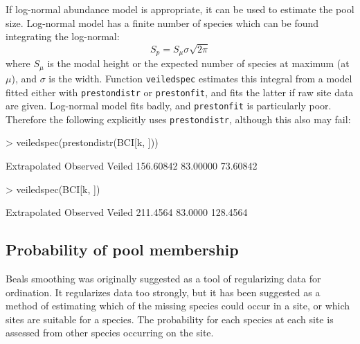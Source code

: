 \documentclass[a4paper,10pt]{amsart}
\begin{document}
If log-normal abundance model is appropriate, it can be used to
estimate the pool size.  Log-normal model has a finite number of
species which can be found integrating the log-normal:
\begin{equation}
S_p = S_\mu \sigma \sqrt{2 \pi}
\end{equation}
where $S_\mu$ is the modal height or the expected number of species at
maximum (at $\mu$), and $\sigma$ is the width.  Function
\texttt{veiledspec} estimates this integral from a model fitted either
with \texttt{prestondistr} or \texttt{prestonfit}, and fits the latter
if raw site data are given.  Log-normal model fits badly, and
\texttt{prestonfit} is particularly poor.  Therefore the following
explicitly uses \texttt{prestondistr}, although this also may fail:
\begin{Schunk}
\begin{Sinput}
> veiledspec(prestondistr(BCI[k, ]))
\end{Sinput}
\begin{Soutput}
Extrapolated     Observed       Veiled 
   156.60842     83.00000     73.60842 
\end{Soutput}
\begin{Sinput}
> veiledspec(BCI[k, ])
\end{Sinput}
\begin{Soutput}
Extrapolated     Observed       Veiled 
    211.4564      83.0000     128.4564 
\end{Soutput}
\end{Schunk}

\subsection{Probability of pool membership}

Beals smoothing was originally suggested as a tool of regularizing data
for ordination.  It regularizes data too strongly,
but it has been suggested as a method of estimating which of the
missing species could occur in a site, or which sites are suitable for
a species.  The probability for each species at each site is assessed
from other species occurring on the site.
\end{document}
